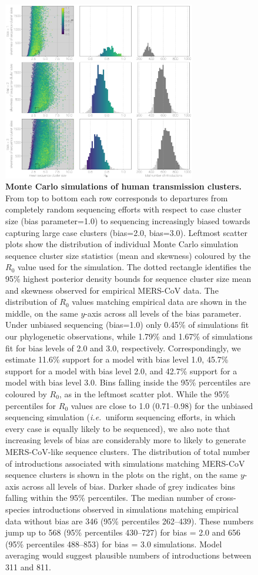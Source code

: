 \documentclass[9pt,lineno]{elife}
\begin{document}
\begin{figure}[h]
\centering
	\includegraphics[width=0.75\textwidth]{figures/mers_epi_grid.png}
	\caption{\textbf{Monte Carlo simulations of human transmission clusters.}
From top to bottom each row corresponds to departures from completely random sequencing efforts with respect to case cluster size (bias parameter=1.0) to sequencing increasingly biased towards capturing large case clusters (bias=2.0, bias=3.0).
Leftmost scatter plots show the distribution of individual Monte Carlo simulation sequence cluster size statistics (mean and skewness) coloured by the $R_{0}$ value used for the simulation.
The dotted rectangle identifies the 95\% highest posterior density bounds for sequence cluster size mean and skewness observed for empirical MERS-CoV data.
The distribution of $R_{0}$ values matching empirical data are shown in the middle, on the same $y$-axis across all levels of the bias parameter.
Under unbiased sequencing (bias=1.0) only 0.45\% of simulations fit our phylogenetic observations, while 1.79\% and 1.67\% of simulations fit for bias levels of 2.0 and 3.0, respectively.
Correspondingly, we estimate 11.6\% support for a model with bias level 1.0, 45.7\% support for a model with bias level 2.0, and 42.7\% support for a model with bias level 3.0.
Bins falling inside the 95\% percentiles are coloured by $R_{0}$, as in the leftmost scatter plot.
While the 95\% percentiles for $R_{0}$ values are close to 1.0 (0.71--0.98) for the unbiased sequencing simulation (\textit{i.e.}\ uniform sequencing efforts, in which every case is equally likely to be sequenced), we also note that increasing levels of bias are considerably more to likely to generate MERS-CoV-like sequence clusters.
The distribution of total number of introductions associated with simulations matching MERS-CoV sequence clusters is shown in the plots on the right, on the same $y$-axis across all levels of bias.
Darker shade of grey indicates bins falling within the 95\% percentiles.
The median number of cross-species introductions observed in simulations matching empirical data without bias are 346 (95\% percentiles 262--439).
These numbers jump up to 568 (95\% percentiles 430--727) for bias = 2.0 and 656 (95\% percentiles 488--853) for bias = 3.0 simulations.
Model averaging would suggest plausible numbers of introductions between 311 and 811.
  }
	\label{mers_epi_grid}
\end{figure}
\end{document}

